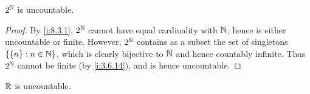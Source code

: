 \begin{cor}\label{i:8.3.3}
  \(2^{\mathbb{N}}\) is uncountable.
\end{cor}

\begin{proof}
  By \cref{i:8.3.1}, \(2^{\mathbb{N}}\) cannot have equal cardinality with \(\mathbb{N}\), hence is either uncountable or finite.
  However, \(2^{\mathbb{N}}\) contains as a subset the set of singletons \(\left\lbrace\left\lbrace n\right\rbrace : n \in \mathbb{N}\right\rbrace\), which is clearly bijective to \(\mathbb{N}\) and hence countably infinite.
  Thus \(2^{\mathbb{N}}\) cannot be finite (by \cref{i:3.6.14}), and is hence uncountable.
\end{proof}

\begin{cor}\label{i:8.3.4}
  \(\mathbb{R}\) is uncountable.
\end{cor}

